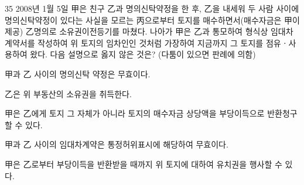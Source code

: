 \begin{question}{35}
2008년 1월 5일 甲은 친구 乙과 명의신탁약정을 한 후, 乙을 내세워 두 사람 사이에 명의신탁약정이 있다는 사실을 모르는 丙으로부터 토지를 매수하면서(매수자금은 甲이 제공) 乙명의로 소유권이전등기를 마쳤다. 나아가 甲은 乙과 통모하여 형식상 임대차계약서를 작성하여 위 토지의 임차인인 것처럼 가장하여 지금까지 그 토지를 점유ㆍ사용하여 왔다. 다음 설명으로 옳지 않은 것은? (다툼이 있으면 판례에 의함)
\begin{choices}
  \item 甲과 乙 사이의 명의신탁 약정은 무효이다.
  \item 乙은 위 부동산의 소유권을 취득한다.
  \item 甲은 乙에게 토지 그 자체가 아니라 토지의 매수자금 상당액을 부당이득으로 반환청구할 수 있다.
  \item 甲과 乙 사이의 임대차계약은 통정허위표시에 해당하여 무효이다.
  \item 甲은 乙로부터 부당이득을 반환받을 때까지 위 토지에 대하여 유치권을 행사할 수 있다.
\end{choices}
\end{question}
